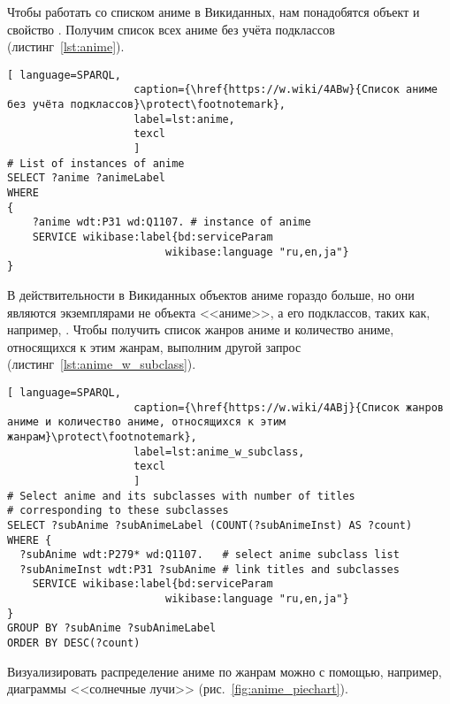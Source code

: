 Чтобы работать со списком аниме в Викиданных, нам понадобятся объект  и свойство . Получим список всех аниме без учёта подклассов (листинг~\ref{lst:anime}).

\newpage

\begin{lstlisting}[ language=SPARQL, 
                    caption={\href{https://w.wiki/4ABw}{Список аниме без учёта подклассов}\protect\footnotemark},
                    label=lst:anime,
                    texcl 
                    ]
# List of instances of anime
SELECT ?anime ?animeLabel
WHERE
{
    ?anime wdt:P31 wd:Q1107. # instance of anime
    SERVICE wikibase:label{bd:serviceParam
					     wikibase:language "ru,en,ja"}
}
\end{lstlisting}%

В действительности в Викиданных объектов аниме гораздо больше, но они являются экземплярами не объекта <<аниме>>, а его подклассов, таких как, например, . Чтобы получить список жанров аниме и количество аниме, относящихся к этим жанрам, выполним другой запрос (листинг~\ref{lst:anime_w_subclass}).

\begin{lstlisting}[ language=SPARQL, 
                    caption={\href{https://w.wiki/4ABj}{Список жанров аниме и количество аниме, относящихся к этим жанрам}\protect\footnotemark},
                    label=lst:anime_w_subclass,
                    texcl 
                    ]
# Select anime and its subclasses with number of titles
# corresponding to these subclasses
SELECT ?subAnime ?subAnimeLabel (COUNT(?subAnimeInst) AS ?count)
WHERE {
  ?subAnime wdt:P279* wd:Q1107.   # select anime subclass list
  ?subAnimeInst wdt:P31 ?subAnime # link titles and subclasses
    SERVICE wikibase:label{bd:serviceParam
					     wikibase:language "ru,en,ja"}
}
GROUP BY ?subAnime ?subAnimeLabel
ORDER BY DESC(?count)
\end{lstlisting}%

Визуализировать распределение аниме по жанрам можно с помощью, например, диаграммы <<солнечные лучи>> (рис.~\ref{fig:anime_piechart}).

